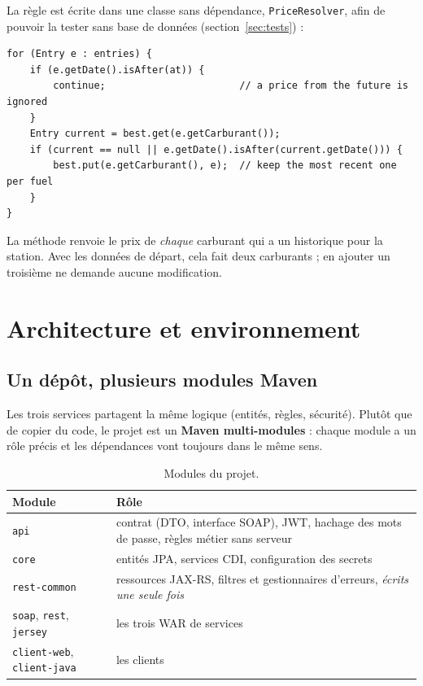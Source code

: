 \documentclass[11pt,a4paper]{article}
\newcommand{\code}[1]{\texttt{#1}}
\begin{document}
La règle est écrite dans une classe sans dépendance, \code{PriceResolver}, afin de pouvoir la tester sans base de données (section~\ref{sec:tests}) :

\begin{lstlisting}[language=JavaX]
for (Entry e : entries) {
    if (e.getDate().isAfter(at)) {
        continue;                       // a price from the future is ignored
    }
    Entry current = best.get(e.getCarburant());
    if (current == null || e.getDate().isAfter(current.getDate())) {
        best.put(e.getCarburant(), e);  // keep the most recent one per fuel
    }
}
\end{lstlisting}

La méthode renvoie le prix de \emph{chaque} carburant qui a un historique pour la station. Avec les données de départ, cela fait deux carburants ; en ajouter un troisième ne demande aucune modification.

\section{Architecture et environnement}
\subsection{Un dépôt, plusieurs modules Maven}
Les trois services partagent la même logique (entités, règles, sécurité). Plutôt que de copier du code, le projet est un \textbf{Maven multi-modules} : chaque module a un rôle précis et les dépendances vont toujours dans le même sens.

\begin{table}[H]
\centering
\small
\begin{tabular}{@{}lp{9.2cm}@{}}
\toprule
\textbf{Module} & \textbf{Rôle}\\
\midrule
\code{api} & contrat (DTO, interface SOAP), JWT, hachage des mots de passe, règles métier sans serveur\\
\code{core} & entités JPA, services CDI, configuration des secrets\\
\code{rest-common} & ressources JAX-RS, filtres et gestionnaires d'erreurs, \emph{écrits une seule fois}\\
\code{soap}, \code{rest}, \code{jersey} & les trois WAR de services\\
\code{client-web}, \code{client-java} & les clients\\
\bottomrule
\end{tabular}
\caption{Modules du projet.}
\end{table}
\end{document}
